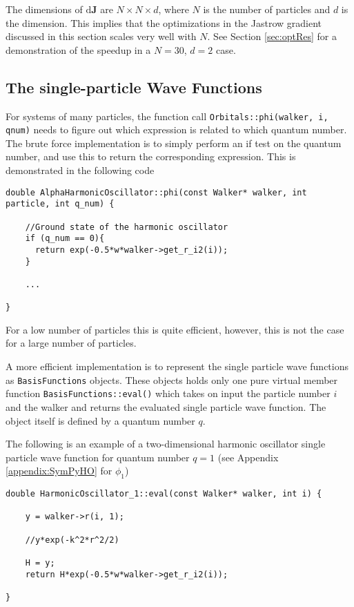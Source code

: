 The dimensions of $\mathrm{d}\mathbf{J}$ are $N\times N\times d$, where $N$ is the number of particles and $d$ is the dimension. This implies that the optimizations in the Jastrow gradient discussed in this section scales very well with $N$. See Section \ref{sec:optRes} for a demonstration of the speedup in a $N=30$, $d=2$ case. 


\subsection{The single-particle Wave Functions}
\label{sec:optSPWFqnumIndie}

For systems of many particles, the function call \verb+Orbitals::phi(walker, i, qnum)+ needs to figure out which expression is related to which quantum number. The brute force implementation is to simply perform an if test on the quantum number, and use this to return the corresponding expression. This is demonstrated in the following code

\clearpage
\vspace{0.25cm}
\begin{lstlisting}
double AlphaHarmonicOscillator::phi(const Walker* walker, int particle, int q_num) {
    
    //Ground state of the harmonic oscillator
    if (q_num == 0){
      return exp(-0.5*w*walker->get_r_i2(i));
    }
    
    ...
    
}
\end{lstlisting}

For a low number of particles this is quite efficient, however, this is not the case for a large number of particles. 

A more efficient implementation is to represent the single particle wave functions as \verb+BasisFunctions+ objects. These objects holds only one pure virtual member function \verb+BasisFunctions::eval()+ which takes on input the particle number $i$ and the walker and returns the evaluated single particle wave function. The object itself is defined by a quantum number $q$. 

The following is an example of a two-dimensional harmonic oscillator single particle wave function for quantum number $q=1$ (see Appendix \ref{appendix:SymPyHO} for $\phi_1$)

\vspace{0.25cm}
\begin{lstlisting}
double HarmonicOscillator_1::eval(const Walker* walker, int i) {

    y = walker->r(i, 1);
    
    //y*exp(-k^2*r^2/2)
    
    H = y;
    return H*exp(-0.5*w*walker->get_r_i2(i));
    
}
\end{lstlisting}

